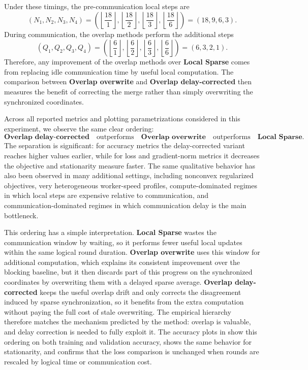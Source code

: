 \documentclass{article}
\theoremstyle{plain}
\theoremstyle{definition}
\begin{document}
Under these timings, the pre-communication local steps are
\begin{equation}
    (N_1,N_2,N_3,N_4)
    =
    \left(
    \left\lfloor \frac{18}{1} \right\rfloor,
    \left\lfloor \frac{18}{2} \right\rfloor,
    \left\lfloor \frac{18}{3} \right\rfloor,
    \left\lfloor \frac{18}{6} \right\rfloor
    \right)
    =
    (18,9,6,3).
\end{equation}
During communication, the overlap methods perform the additional steps
\begin{equation}
    (Q_1,Q_2,Q_3,Q_4)
    =
    \left(
    \left\lfloor \frac{6}{1} \right\rfloor,
    \left\lfloor \frac{6}{2} \right\rfloor,
    \left\lfloor \frac{6}{3} \right\rfloor,
    \left\lfloor \frac{6}{6} \right\rfloor
    \right)
    =
    (6,3,2,1).
\end{equation}
Therefore, any improvement of the overlap methods over \textbf{Local Sparse} comes from replacing idle communication time by useful local computation. 
The comparison between \textbf{Overlap overwrite} and \textbf{Overlap delay-corrected} then measures the benefit of correcting the merge rather than simply overwriting the synchronized coordinates.

Across all reported metrics and plotting parametrizations considered in this experiment, we observe the same clear ordering:
\[
    \textbf{Overlap delay-corrected}
    \quad \text{outperforms} \quad
    \textbf{Overlap overwrite}
    \quad \text{outperforms} \quad
    \textbf{Local Sparse}.
\]
The separation is significant: for accuracy metrics the delay-corrected variant reaches higher values earlier, while for loss and gradient-norm metrics it decreases the objective and stationarity measure faster. 
The same qualitative behavior has also been observed in many additional settings, including nonconvex regularized objectives, very heterogeneous worker-speed profiles, compute-dominated regimes in which local steps are expensive relative to communication, and communication-dominated regimes in which communication delay is the main bottleneck.

This ordering has a simple interpretation. 
\textbf{Local Sparse} wastes the communication window by waiting, so it performs fewer useful local updates within the same logical round duration. 
\textbf{Overlap overwrite} uses this window for additional computation, which explains its consistent improvement over the blocking baseline, but it then discards part of this progress on the synchronized coordinates by overwriting them with a delayed sparse average. 
\textbf{Overlap delay-corrected} keeps the useful overlap drift and only corrects the disagreement induced by sparse synchronization, so it benefits from the extra computation without paying the full cost of stale overwriting. 
The empirical hierarchy therefore matches the mechanism predicted by the method: overlap is valuable, and delay correction is needed to fully exploit it.
The accuracy plots in  show this ordering on both training and validation accuracy,  shows the same behavior for stationarity, and  confirms that the loss comparison is unchanged when rounds are rescaled by logical time or communication cost.
\end{document}
